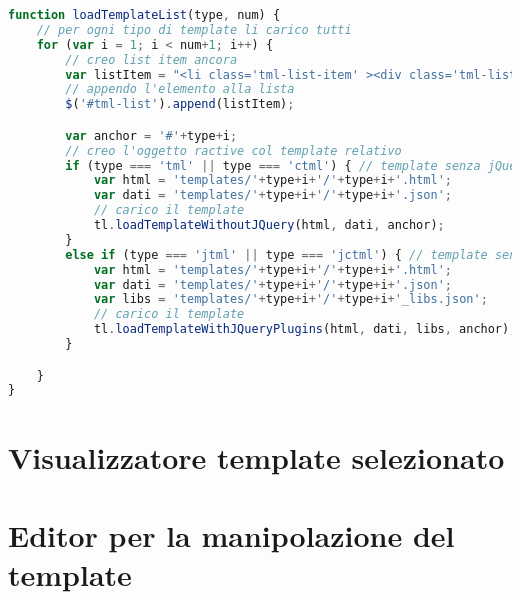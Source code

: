 \begin{lstlisting}[language=JavaScript, caption=Implementazione \texttt{loadTemplateList().}]
function loadTemplateList(type, num) {
	// per ogni tipo di template li carico tutti
	for (var i = 1; i < num+1; i++) {
		// creo list item ancora
		var listItem = "<li class='tml-list-item' ><div class='tml-list-item-div'><a class='tml-list-item-a' onclick='selectTml(this)' href='javascript:void(0)' id='"+type+i+"'></a></div></li>";
		// appendo l'elemento alla lista
		$('#tml-list').append(listItem);

		var anchor = '#'+type+i;
		// creo l'oggetto ractive col template relativo
		if (type === 'tml' || type === 'ctml') { // template senza jQuery
			var html = 'templates/'+type+i+'/'+type+i+'.html';
			var dati = 'templates/'+type+i+'/'+type+i+'.json';
			// carico il template
			tl.loadTemplateWithoutJQuery(html, dati, anchor);
		}
		else if (type === 'jtml' || type === 'jctml') { // template senza jQuery
			var html = 'templates/'+type+i+'/'+type+i+'.html';
			var dati = 'templates/'+type+i+'/'+type+i+'.json';
			var libs = 'templates/'+type+i+'/'+type+i+'_libs.json';
			// carico il template
			tl.loadTemplateWithJQueryPlugins(html, dati, libs, anchor);
		}

	}
}
\end{lstlisting}
\section{Visualizzatore template selezionato}

\section{Editor per la manipolazione del template}
